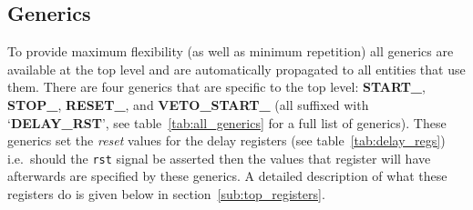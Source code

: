 \subsection{Generics} %
\label{sub:top_generics}
To provide maximum flexibility (as well as minimum repetition) all generics are available at the top level and are automatically propagated to all entities that use them. There are four generics that are specific to the top level: \textbf{START\_}, \textbf{STOP\_}, \textbf{RESET\_}, and \textbf{VETO\_START\_} (all suffixed with `\textbf{DELAY\_RST}', see table~\ref{tab:all_generics} for a full list of generics). These generics set the \emph{reset} values for the delay registers (see table~\ref{tab:delay_regs}) i.e.\ should the \texttt{rst} signal be asserted then the values that register will have afterwards are specified by these generics. A detailed description of what these registers do is given below in section~\ref{sub:top_registers}.
